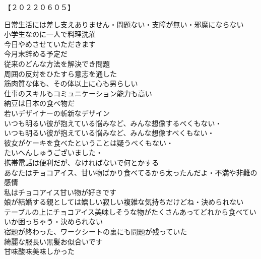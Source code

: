 \begin{multicols}{2}
【２０２２０６０５】\\
\end{multicols}

日常生活には差し支えありません・問題ない・支障が無い・邪魔にならない\\
小学生なのに一人で料理洗濯\\
今日やめさせていただきます\\
今月末辞める予定だ\\
従来のどんな方法を解決でき問題\\
周囲の反対をひたすら意志を通した\\
筋肉質な体も、その体以上に心も男らしい\\
仕事のスキルもコミュニケーション能力も高い\\
納豆は日本の食べ物だ\\
若いデザイナーの斬新なデザイン\\

いつも明るい彼が抱えている悩みなど、みんな想像するべくもない・\\
いつも明るい彼が抱えている悩みなど、みんな想像すべくもない・\\
彼女がケーキを食べたということは疑うべくもない・\\

たいへんしゅうございました・\\
携帯電話は便利だが、なければないで何とかする\\

あなたはチョコアイス、甘い物ばかり食べてるから太ったんだよ・不満や非難の感情\\
私はチョコアイス甘い物が好きです\\
娘が結婚する親としては嬉しい寂しい複雑な気持ちだけどね・決められない\\
テーブルの上にチョコアイス美味しそうな物がたくさんあってどれから食べていいか困っちゃう・決められない\\

宿題が終わった、ワークシートの裏にも問題が残っていた\\

綺麗な服長い黒髪お似合いです\\
甘味酸味美味しかった\\

